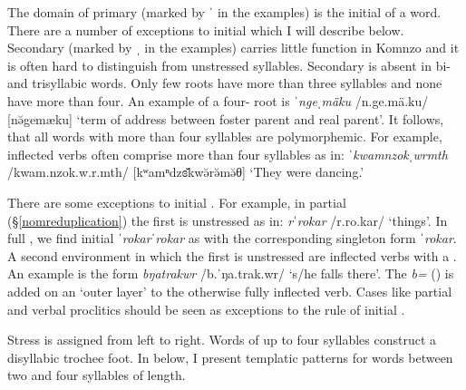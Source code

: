 The domain of primary  (marked by ˈ in the examples) is the initial  of a word. There are a number of exceptions to initial  which I will describe below. Secondary  (marked by ˌ in the examples) carries little function in Komnzo and it is often hard to distinguish from unstressed syllables. Secondary  is absent in bi- and trisyllabic words. Only few roots have more than three syllables and none have more than four. An example of a four- root is \emph{ˈngeˌmäku} /n.ge.mä.ku/ [nə̆{\ᵑ}gemæku] `term of address between foster parent and real parent'. It follows, that all words with more than four syllables are polymorphemic. For example, inflected verbs often comprise more than four syllables as in: \emph{ˈkwamnzokˌwrmth} /kwam.nzok.w.r.mth/ [kʷamⁿdzɞ̆kwə̆rə̆mə̆θ] `They were dancing.'%

There are some exceptions to initial . For example, in partial  (\S{}\ref{nomreduplication}) the first  is unstressed as in: \emph{rˈrokar} /r.ro.kar/ `things'. In full , we find initial  \emph{ˈrokarˈrokar} as with the corresponding singleton form \emph{ˈrokar}. A second environment in which the first  is unstressed are inflected verbs with a . An example is the form \emph{bŋatrakwr} /b.ˈŋa.trak.wr/ `s/he falls there'. The  \emph{b=} (\Med{}) is added on an `outer layer' to the otherwise fully inflected verb. Cases like partial  and verbal proclitics should be seen as exceptions to the rule of initial .%

Stress is assigned from left to right. Words of up to four syllables construct a disyllabic trochee foot. In  below, I present templatic  patterns for words between two and four syllables of length.

